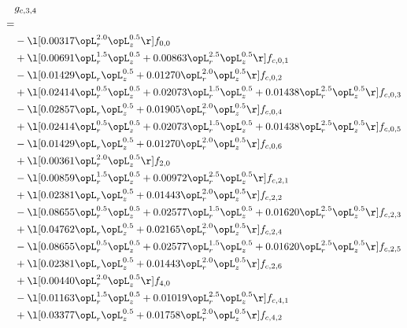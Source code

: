 \begin{alignat}{2} 
\label{eq:g_34_0} 
& g_{c,3,4} \nonumber \\ 
 = \\ 
& - \l[  0.00317 \opL_r^{2.0} \opL_z^{0.5}  \r] f_{0,0} \nonumber \\ 
& + \l[  0.00691 \opL_r^{1.5} \opL_z^{0.5} +  0.00863 \opL_r^{2.5} \opL_z^{0.5}  \r] f_{c,0,1} \nonumber \\ 
& - \l[  0.01429 \opL_r \opL_z^{0.5} +  0.01270 \opL_r^{2.0} \opL_z^{0.5}  \r] f_{c,0,2} \nonumber \\ 
& + \l[  0.02414 \opL_r^{0.5} \opL_z^{0.5} +  0.02073 \opL_r^{1.5} \opL_z^{0.5} +  0.01438 \opL_r^{2.5} \opL_z^{0.5}  \r] f_{c,0,3} \nonumber \\ 
& - \l[  0.02857 \opL_r \opL_z^{0.5} +  0.01905 \opL_r^{2.0} \opL_z^{0.5}  \r] f_{c,0,4} \nonumber \\ 
& + \l[  0.02414 \opL_r^{0.5} \opL_z^{0.5} +  0.02073 \opL_r^{1.5} \opL_z^{0.5} +  0.01438 \opL_r^{2.5} \opL_z^{0.5}  \r] f_{c,0,5} \nonumber \\ 
& - \l[  0.01429 \opL_r \opL_z^{0.5} +  0.01270 \opL_r^{2.0} \opL_z^{0.5}  \r] f_{c,0,6} \nonumber \\ 
& + \l[  0.00361 \opL_r^{2.0} \opL_z^{0.5}  \r] f_{2,0} \nonumber \\ 
& - \l[  0.00859 \opL_r^{1.5} \opL_z^{0.5} +  0.00972 \opL_r^{2.5} \opL_z^{0.5}  \r] f_{c,2,1} \nonumber \\ 
& + \l[  0.02381 \opL_r \opL_z^{0.5} +  0.01443 \opL_r^{2.0} \opL_z^{0.5}  \r] f_{c,2,2} \nonumber \\ 
& - \l[  0.08655 \opL_r^{0.5} \opL_z^{0.5} +  0.02577 \opL_r^{1.5} \opL_z^{0.5} +  0.01620 \opL_r^{2.5} \opL_z^{0.5}  \r] f_{c,2,3} \nonumber \\ 
& + \l[  0.04762 \opL_r \opL_z^{0.5} +  0.02165 \opL_r^{2.0} \opL_z^{0.5}  \r] f_{c,2,4} \nonumber \\ 
& - \l[  0.08655 \opL_r^{0.5} \opL_z^{0.5} +  0.02577 \opL_r^{1.5} \opL_z^{0.5} +  0.01620 \opL_r^{2.5} \opL_z^{0.5}  \r] f_{c,2,5} \nonumber \\ 
& + \l[  0.02381 \opL_r \opL_z^{0.5} +  0.01443 \opL_r^{2.0} \opL_z^{0.5}  \r] f_{c,2,6} \nonumber \\ 
& + \l[  0.00440 \opL_r^{2.0} \opL_z^{0.5}  \r] f_{4,0} \nonumber \\ 
& - \l[  0.01163 \opL_r^{1.5} \opL_z^{0.5} +  0.01019 \opL_r^{2.5} \opL_z^{0.5}  \r] f_{c,4,1} \nonumber \\ 
& + \l[  0.03377 \opL_r \opL_z^{0.5} +  0.01758 \opL_r^{2.0} \opL_z^{0.5}  \r] f_{c,4,2} \nonumber \\ 

\end{alignat}
